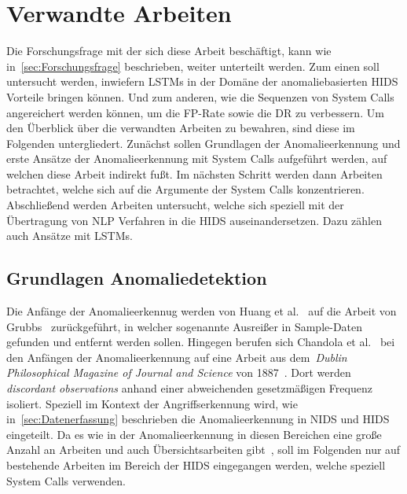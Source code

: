 \chapter{Verwandte Arbeiten}\label{ch:verwandte_arbeiten}

Die Forschungsfrage mit der sich diese Arbeit beschäftigt, kann wie in~\autoref{sec:Forschungsfrage} beschrieben, weiter unterteilt werden.
Zum einen soll untersucht werden, inwiefern \acp{LSTM} in der Domäne der anomaliebasierten \ac{HIDS} Vorteile bringen können.
Und zum anderen, wie die Sequenzen von System Calls angereichert werden können, um die \ac{FP}-Rate sowie die \acf{DR} zu verbessern.
Um den Überblick über die verwandten Arbeiten zu bewahren, sind diese im Folgenden untergliedert.
Zunächst sollen Grundlagen der Anomalieerkennung und erste Ansätze der Anomalieerkennung mit System Calls aufgeführt werden, auf welchen diese Arbeit indirekt fußt.
Im nächsten Schritt werden dann Arbeiten betrachtet, welche sich auf die Argumente der System Calls konzentrieren.
Abschließend werden Arbeiten untersucht, welche sich speziell mit der Übertragung von \ac{NLP} Verfahren in die \ac{HIDS} auseinandersetzen.
Dazu zählen auch Ansätze mit \acp{LSTM}.

    \section{Grundlagen Anomaliedetektion}

        Die Anfänge der Anomalieerkennug werden von Huang et al.~\cite{ANOMALYBOOKKISHAN2017} auf die Arbeit von Grubbs~\cite{ANOMALYDEFINITION1969} zurückgeführt, in welcher sogenannte Ausreißer in Sample-Daten gefunden und entfernt werden sollen.
        Hingegen berufen sich Chandola et al.~\cite{ANOMALYSURVEY} bei den Anfängen der Anomalieerkennung auf eine Arbeit aus dem~\textit{Dublin Philosophical Magazine of Journal and Science} von 1887~\cite{ANOMALYDEFINITION1887}.
        Dort werden \textit{discordant observations} anhand einer abweichenden gesetzmäßigen Frequenz isoliert. 
        Speziell im Kontext der Angriffserkennung wird, wie in~\autoref{sec:Datenerfassung} beschrieben die Anomalieerkennung in \ac{NIDS} und \ac{HIDS} eingeteilt.
        Da es wie in der Anomalieerkennung in diesen Bereichen eine große Anzahl an Arbeiten und auch Übersichtsarbeiten gibt~\cite{ANOMALYSURVEY, ANOMALYSURVEY2, ANOMALYSURVEY3}, soll im Folgenden nur auf bestehende Arbeiten im Bereich der \ac{HIDS} eingegangen werden, welche speziell System Calls verwenden.

